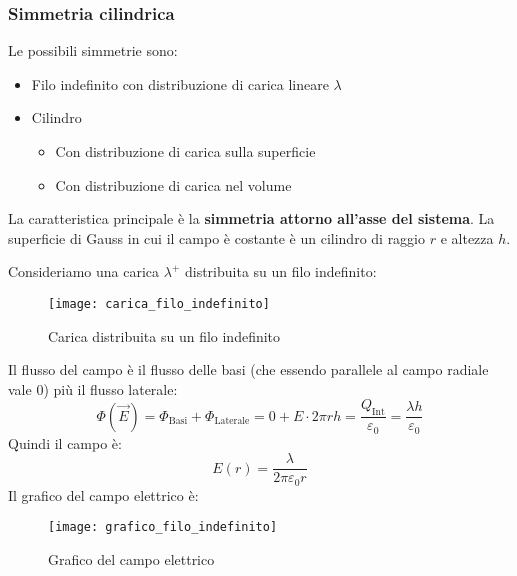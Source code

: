 \documentclass[a4paper]{article}
\begin{document}
\subsubsection{Simmetria cilindrica}
Le possibili simmetrie sono:
\begin{itemize}
  \item Filo indefinito con distribuzione di carica lineare \( \lambda \)
  \item Cilindro
    \begin{itemize}
      \item Con distribuzione di carica sulla superficie
      \item Con distribuzione di carica nel volume
    \end{itemize}
\end{itemize}
La caratteristica principale è la \textbf{simmetria attorno all'asse del sistema}.
La superficie di Gauss in cui il campo è costante è un cilindro di raggio \( r \) e
altezza \( h \).
\begin{example}
  Consideriamo una carica \( \lambda^+ \) distribuita su un filo indefinito:
  \begin{figure}[H]
    \centering
    \texttt{[image: carica\_filo\_indefinito]}
    \caption{Carica distribuita su un filo indefinito}
  \end{figure}
  \noindent
  Il flusso del campo è il flusso delle basi (che essendo parallele al campo radiale
  vale 0) più il flusso laterale:
  \[
    \Phi (\vec{E}) = \Phi_{\text{Basi}} + \Phi_{\text{Laterale}} = 0 + E \cdot 2 \pi r h =
    \frac{Q_{\text{Int}}}{\varepsilon_0} = \frac{\lambda h}{\varepsilon_0}
  \] 
  Quindi il campo è:
  \[
    E(r) = \frac{\lambda}{2 \pi \varepsilon_0 r}
  \] 
  Il grafico del campo elettrico è:
  \begin{figure}[H]
    \centering
    \texttt{[image: grafico\_filo\_indefinito]}
    \caption{Grafico del campo elettrico}
  \end{figure}
\end{example}
\end{document}
